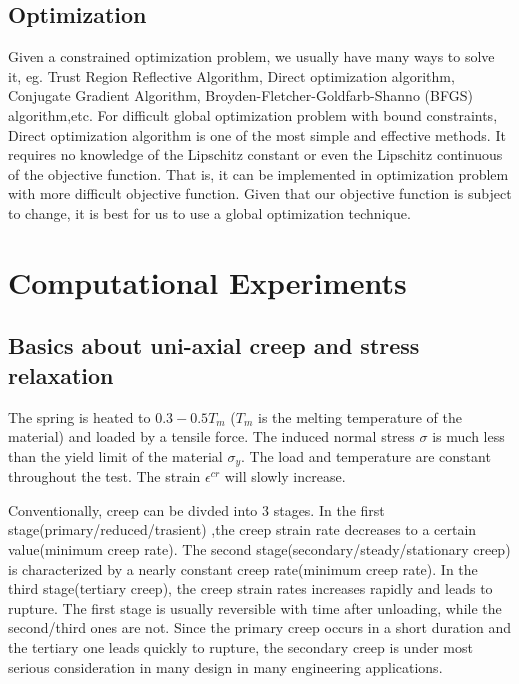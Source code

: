 \documentclass[10pt]{article}
\begin{document}
\subsection{Optimization}

Given a constrained optimization problem, we usually have many ways to solve it, eg. Trust Region Reflective Algorithm, Direct optimization algorithm, Conjugate Gradient Algorithm, Broyden-Fletcher-Goldfarb-Shanno (BFGS) algorithm,etc. For difficult global optimization problem with bound constraints, Direct optimization algorithm is one of the most simple and effective methods. It requires no knowledge of the Lipschitz constant or even the Lipschitz continuous of the objective function. That is, it can be implemented in optimization problem with more difficult objective function. Given that our objective function is subject to change, it is best for us to use a global optimization technique. 

\cite{Derivative} \cite{DirectPaper} \cite{MATLAB:2014a} \cite{DirectUserGuide}
 
 

\section{Computational Experiments}
\subsection{Basics about uni-axial creep and stress relaxation}
The spring is heated to $0.3-0.5T_m$ ($T_m$ is the melting temperature of the material) and loaded by a tensile force. The induced normal stress $\sigma$ is much less than the yield limit of the material $\sigma_y$. The load and temperature are constant throughout the test. The strain $\epsilon^{cr}$ will slowly increase.

Conventionally, creep can be divded into $3$ stages. In the first stage(primary/reduced/trasient) ,the creep strain rate decreases to a certain value(minimum creep rate). The second stage(secondary/steady/stationary creep) is characterized by a nearly constant creep rate(minimum creep rate). In the third stage(tertiary creep), the creep strain rates increases rapidly and leads to rupture. The first stage is usually reversible with time after unloading, while the second/third ones are not. Since the primary creep occurs in a short duration and the tertiary one leads quickly to rupture, the secondary creep is under most serious consideration in many design in many engineering applications.
\end{document}
